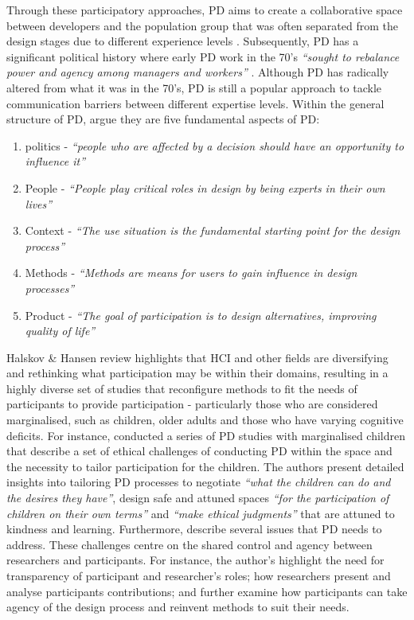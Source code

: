 Through these participatory approaches, PD aims to create a collaborative space between developers and the population group that was often separated from the design stages due to different experience levels \citep{duarte2018participatory}. Subsequently, PD has a significant political history where early PD work in the 70's \textit{``sought to rebalance power and agency among managers and workers''} \citep{bannon2018introduction}. Although PD has radically altered from what it was in the 70's, PD is still a popular approach to tackle communication barriers between different expertise levels. 
Within the general structure of PD, \cite{halskov2015diversity} argue they are five fundamental aspects of PD:
\begin{enumerate}
\item politics - \textit{``people who are affected by a decision should have an opportunity to influence it''}
\item People - \textit{``People play critical roles in design by being experts in their own lives''}
\item Context - \textit{``The use situation is the fundamental starting point for the design process''}
\item Methods - \textit{``Methods are means for users to gain influence in design processes''}
\item Product - \textit{``The goal of participation is to design alternatives, improving quality of life''}
\end{enumerate}

Halskov \& Hansen review highlights that HCI and other fields are diversifying and rethinking what participation may be within their domains, resulting in a highly diverse set of studies that reconfigure methods to fit the needs of participants to provide participation - particularly those who are considered marginalised, such as children, older adults and those who have varying cognitive deficits. For instance, \cite{spiel2018micro} conducted a series of PD studies with marginalised children that describe a set of ethical challenges of conducting PD within the space and the necessity to tailor participation for the children. The authors present detailed insights into tailoring PD processes to negotiate \textit{``what the children can do and the desires they have''}, design safe and attuned spaces \textit{``for the participation of children on their own terms''} and \textit{``make ethical judgments''} that are attuned to kindness and learning. Furthermore, \cite{vines_configuring_2013} describe several issues that PD needs to address. These challenges centre on the shared control and agency between researchers and participants. For instance, the author's highlight the need for transparency of participant and researcher's roles; how researchers present and analyse participants contributions; and further examine how participants can take agency of the design process and reinvent methods to suit their needs.


